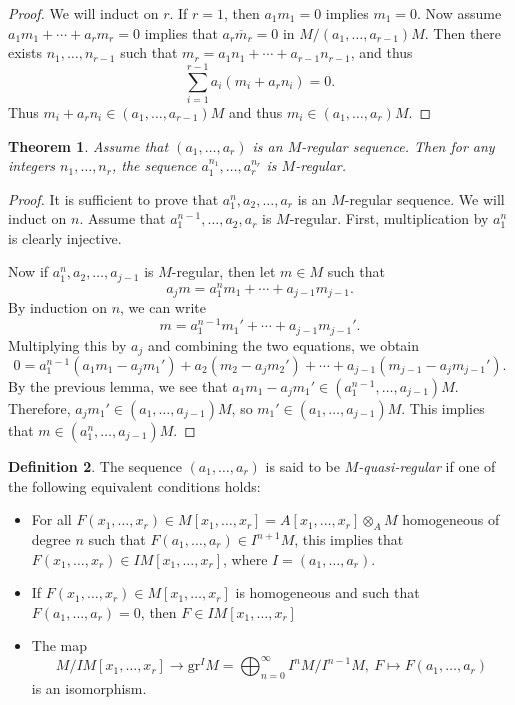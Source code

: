 \documentclass[leqno, openany]{memoir}
\newtheorem{thm}{Theorem}[section]
\theoremstyle{definition}
\newtheorem{defn}[thm]{Definition}
\theoremstyle{remark}
\theoremstyle{plain}
\theoremstyle{definition}
\theoremstyle{remark}
\newcommand{\mr}[1]{\mathrm{#1}}
\newcommand{\ol}[1]{\overline{#1}}
\begin{document}
\begin{proof}
    We will induct on $r$. If $r = 1$, then $a_1 m_1 = 0$ implies $m_1 = 0$. Now assume $a_1 m_1 + \cdots + a_r m_r = 0$ implies that $a_r \ol{m}_r = 0$ in $M / (a_1, \ldots, a_{r-1}) M$. Then there exists $n_1, \ldots, n_{r-1}$ such that $m_r = a_1 n_1 + \cdots + a_{r-1} n_{r-1}$, and thus
    \[ \sum_{i=1}^{r-1} a_i (m_i + a_r n_i) = 0. \]
    Thus $m_i + a_r n_i \in (a_1, \ldots, a_{r-1})M$ and thus $m_i \in (a_1, \ldots, a_r)M$.
\end{proof}

\begin{thm}
    Assume that $(a_1, \ldots, a_r)$ is an $M$-regular sequence. Then for any integers $n_1, \ldots, n_r$, the sequence $a_1^{n_1}, \ldots, a_r^{n_r}$ is $M$-regular. 
\end{thm}

\begin{proof}
    It is sufficient to prove that $a_1^n, a_2, \ldots, a_r$ is an $M$-regular sequence. We will induct on $n$. Assume that $a_1^{n-1}, \ldots, a_2, a_r$ is $M$-regular. First, multiplication by $a_1^n$ is clearly injective. 

    Now if $a_1^n, a_2, \ldots, a_{j-1}$ is $M$-regular, then let $m \in M$ such that 
    \[ a_j m = a_1^n m_1 + \cdots + a_{j-1} m_{j-1}. \]
    By induction on $n$, we can write
    \[ m = a_1^{n-1} m_1' + \cdots + a_{j-1} m_{j-1}'. \]
    Multiplying this by $a_j$ and combining the two equations, we obtain
    \[ 0 = a_1^{n-1}(a_1 m_1 - a_jm_1') + a_2(m_2 - a_jm_2') + \cdots + a_{j-1}(m_{j-1} - a_j m_{j-1}'). \]
    By the previous lemma, we see that $a_1 m_1 - a_j m_1' \in (a_1^{n-1}, \ldots, a_{j-1})M$. Therefore, $a_j m_1' \in (a_1, \ldots, a_{j-1})M$, so $m_1' \in (a_1, \ldots, a_{j-1})M$. This implies that $m \in (a_1^n, \ldots, a_{j-1})M$.
\end{proof}

\begin{defn}
    The sequence $(a_1, \ldots, a_r)$ is said to be \textit{$M$-quasi-regular} if one of the following equivalent conditions holds:
    \begin{itemize}
        \item For all $F(x_1, \ldots, x_r) \in M[x_1, \ldots, x_r] = A[x_1, \ldots, x_r] \otimes_A M$ homogeneous of degree $n$ such that $F(a_1, \ldots, a_r) \in I^{n+1}M$, this implies that $F(x_1, \ldots, x_r) \in IM[x_1, \ldots, x_r]$, where $I = (a_1, \ldots, a_r)$.
        \item If $F(x_1, \ldots, x_r) \in M[x_1, \ldots, x_r]$ is homogeneous and such that $F(a_1, \ldots, a_r) = 0$, then $F \in IM[x_1, \ldots, x_r]$ 
            \item The map
            \[ M/IM[x_1, \ldots, x_r] \to \mr{gr}^I M = \bigoplus_{n=0}^{\infty} I^n M / I^{n-1}M,\ F \mapsto F(a_1, \ldots, a_r) \]
            is an isomorphism.
    \end{itemize}
\end{defn}
\end{document}
